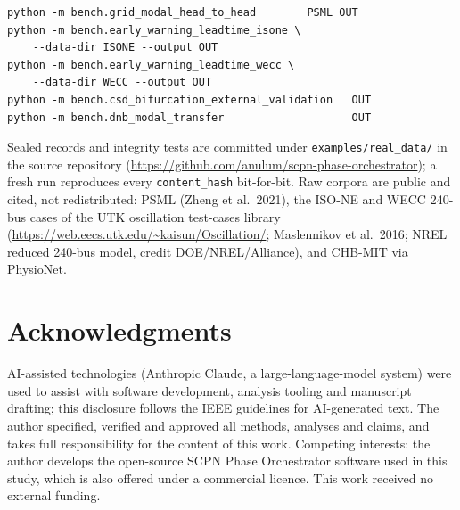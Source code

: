\documentclass[journal]{IEEEtran}
\newcommand{\code}[1]{\texttt{#1}}
\begin{document}
{\scriptsize\begin{verbatim}
python -m bench.grid_modal_head_to_head        PSML OUT
python -m bench.early_warning_leadtime_isone \
    --data-dir ISONE --output OUT
python -m bench.early_warning_leadtime_wecc \
    --data-dir WECC --output OUT
python -m bench.csd_bifurcation_external_validation   OUT
python -m bench.dnb_modal_transfer                    OUT
\end{verbatim}}

Sealed records and integrity tests are committed under
\code{examples/real\_data/} in the source repository
(\url{https://github.com/anulum/scpn-phase-orchestrator}); a fresh run
reproduces every \code{content\_hash} bit-for-bit. Raw corpora are
public and cited, not redistributed: PSML (Zheng et al.\ 2021), the
ISO-NE and WECC 240-bus cases of the UTK oscillation test-cases library
(\url{https://web.eecs.utk.edu/~kaisun/Oscillation/}; Maslennikov et
al.\ 2016; NREL reduced 240-bus model, credit DOE/NREL/Alliance), and
CHB-MIT via PhysioNet.

\section*{Acknowledgments}

AI-assisted technologies (Anthropic Claude, a large-language-model
system) were used to assist with software development, analysis
tooling and manuscript drafting; this disclosure follows the IEEE
guidelines for AI-generated text. The author specified, verified and
approved all methods, analyses and claims, and takes full
responsibility for the content of this work. Competing interests: the
author develops the open-source SCPN Phase Orchestrator software used
in this study, which is also offered under a commercial licence. This
work received no external funding.
\end{document}

